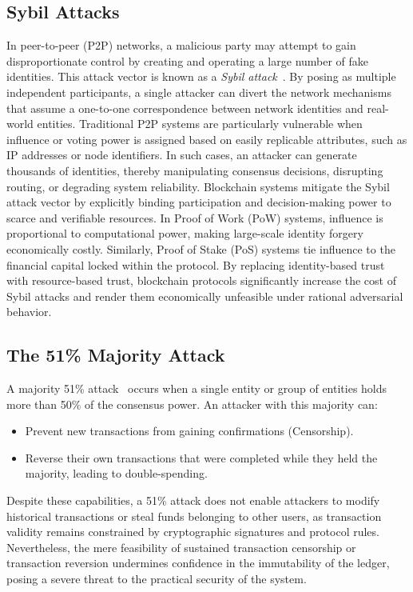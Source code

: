 \subsection{Sybil Attacks}
In peer-to-peer (P2P) networks, a malicious party may attempt to gain disproportionate control by creating and operating a large number of fake identities. This attack vector is known as a \emph{Sybil attack}~\cite{douceur2002sybil}. By posing as multiple independent participants, a single attacker can divert the network mechanisms that assume a one-to-one correspondence between network identities and real-world entities. Traditional P2P systems are particularly vulnerable when influence or voting power is assigned based on easily replicable attributes, such as IP addresses or node identifiers. In such cases, an attacker can generate thousands of identities, thereby manipulating consensus decisions, disrupting routing, or degrading system reliability. Blockchain systems mitigate the Sybil attack vector by explicitly binding participation and decision-making power to scarce and verifiable resources. In Proof of Work (PoW) systems, influence is proportional to computational power, making large-scale identity forgery economically costly. Similarly, Proof of Stake (PoS) systems tie influence to the financial capital locked within the protocol. By replacing identity-based trust with resource-based trust, blockchain protocols significantly increase the cost of Sybil attacks and render them economically unfeasible under rational adversarial behavior.

\subsection{The 51\% Majority Attack}
A majority 51\% attack~\cite{eyal2014majority} occurs when a single entity or group of entities holds more than 50\% of the consensus power. An attacker with this majority can:
\begin{itemize}
    \item Prevent new transactions from gaining confirmations (Censorship).
    \item Reverse their own transactions that were completed while they held the majority, leading to double-spending.
\end{itemize}

Despite these capabilities, a 51\% attack does not enable attackers to modify historical transactions or steal funds belonging to other users, as transaction validity remains constrained by cryptographic signatures and protocol rules. Nevertheless, the mere feasibility of sustained transaction censorship or transaction reversion undermines confidence in the immutability of the ledger, posing a severe threat to the practical security of the system.

